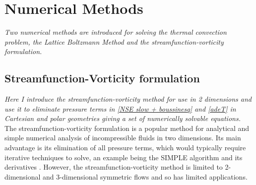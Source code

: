 \documentclass{article}
\begin{document}
\section*{Numerical Methods}
{\it{Two numerical methods are introduced for solving the thermal convection problem, the Lattice Boltzmann Method and the streamfunction-vorticity formulation.}}

\subsection*{Streamfunction-Vorticity formulation}
{\it{Here I introduce the streamfunction-vorticity method for use in 2 dimensions and use it to eliminate pressure terms in \ref{NSE slow + boussinesq} and \ref{adeT} in Cartesian and polar geometries giving a set of numerically solvable equations.}}
\vspace{0.3cm}
\newline
\noindent The streamfunction-vorticity formulation is a popular method for analytical and simple numerical analysis of incompressible fluids in two dimensions. Its main advantage is its elimination of all pressure terms, which would typically require iterative techniques to solve, an example being the SIMPLE algorithm and its derivatives \cite{earn2017investigation}. However, the streamfunction-vorticity method is limited to 2-dimensional and 3-dimensional symmetric flows and so has limited applications.
\newline
\end{document}
